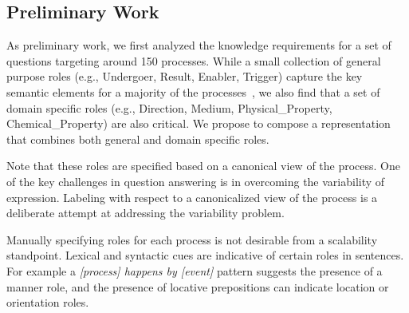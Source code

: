 \subsection{Preliminary Work}

As preliminary work, we first analyzed the knowledge requirements for a set of questions targeting around 150 processes. 
While a small collection of general purpose roles (e.g., Undergoer, Result, Enabler, Trigger) capture the key semantic elements for a 
majority of the processes~\cite{louvan2015:kcap}, we also find that a set of domain specific roles (e.g., Direction, Medium, Physical\_Property, Chemical\_Property) are also critical. We propose to compose a representation that combines both general and domain specific roles. 

Note that these roles are specified based on a canonical view of the process. One of the key challenges in question answering is in overcoming the variability of expression. Labeling with respect to a canonicalized view of the process is a deliberate attempt at addressing the variability problem. 

Manually specifying roles for each process is not desirable from a scalability standpoint.
Lexical and syntactic cues are indicative of certain roles in sentences. 
For example a {\em [process] happens by [event]} pattern suggests the presence of a manner role, and the presence of locative prepositions can indicate location or orientation roles. 



